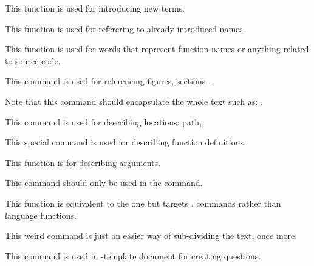          {
           This function is used for introducing new terms.
         }

         {
           This function is used for referering to already introduced names.
         }

         {
           This function is used for words that represent function names
           or anything related to source code.
         }

         {
           This command is used for referencing figures, sections \etc{}.

           \-

           Note that this command should encapsulate the whole text such
           as: .
         }

         {
           This command is used for describing locations: path, 
           \etc{}
         }

         {
           This special command is used for describing function definitions.
         }

         {
           This function is for describing arguments.

           \-

           This command should only be used in the 
           command.
         }

         {
           This function is equivalent to the  one
           but targets ,  \etc{} commands rather than
           language functions.
         }

         {
           This weird command is just an easier way of sub-dividing the
           text, once more.
         }

         {
           This command is used in -template document for
           creating questions.
         }

